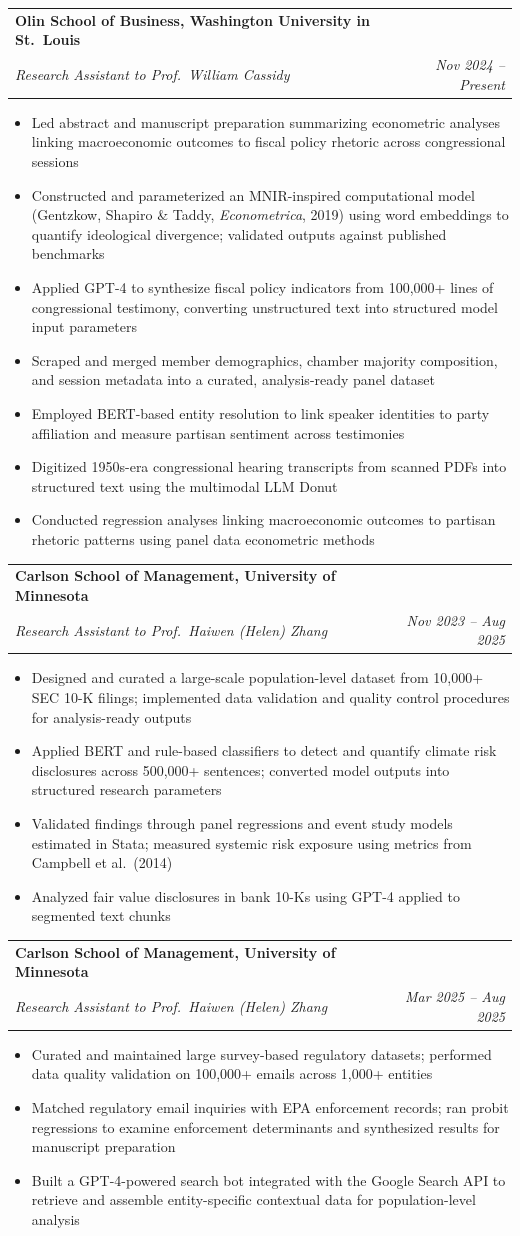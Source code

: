 \documentclass[letterpaper,11pt]{article}
\makeatletter
\newcommand{\resumeItem}[1]{
  \item\small{#1 \vspace{-2pt}}
}
\newcommand{\resumeSubheading}[4]{
  \vspace{-2pt}\item
    \begin{tabular*}{0.97\textwidth}[t]{l@{\extracolsep{\fill}}r}
      \textbf{#1} & \small #2 \\
      \textit{\small#3} & \textit{\small #4} \\
    \end{tabular*}\vspace{-7pt}
}
\newcommand{\resumeItemListStart}{\begin{itemize}}
\newcommand{\resumeItemListEnd}{\end{itemize}\vspace{-5pt}}
\makeatother
\begin{document}
  \resumeSubheading
    {Olin School of Business, Washington University in St.\ Louis}{}
    {Research Assistant to Prof.\ William Cassidy \normalfont{(Empirical Macro-Finance)}}{Nov 2024 -- Present}
    \resumeItemListStart
      \resumeItem{Led abstract and manuscript preparation summarizing econometric analyses linking macroeconomic outcomes to fiscal policy rhetoric across congressional sessions}
      \resumeItem{Constructed and parameterized an MNIR-inspired computational model (Gentzkow, Shapiro \& Taddy, \textit{Econometrica}, 2019) using word embeddings to quantify ideological divergence; validated outputs against published benchmarks}
      \resumeItem{Applied GPT-4 to synthesize fiscal policy indicators from 100,000+ lines of congressional testimony, converting unstructured text into structured model input parameters}
      \resumeItem{Scraped and merged member demographics, chamber majority composition, and session metadata into a curated, analysis-ready panel dataset}
      \resumeItem{Employed BERT-based entity resolution to link speaker identities to party affiliation and measure partisan sentiment across testimonies}
      \resumeItem{Digitized 1950s-era congressional hearing transcripts from scanned PDFs into structured text using the multimodal LLM Donut}
      \resumeItem{Conducted regression analyses linking macroeconomic outcomes to partisan rhetoric patterns using panel data econometric methods}
    \resumeItemListEnd

  \resumeSubheading
    {Carlson School of Management, University of Minnesota}{}
    {Research Assistant to Prof.\ Haiwen (Helen) Zhang \normalfont{(Climate Risk Disclosure)}}{Nov 2023 -- Aug 2025}
    \resumeItemListStart
      \resumeItem{Designed and curated a large-scale population-level dataset from 10,000+ SEC 10-K filings; implemented data validation and quality control procedures for analysis-ready outputs}
      \resumeItem{Applied BERT and rule-based classifiers to detect and quantify climate risk disclosures across 500,000+ sentences; converted model outputs into structured research parameters}
      \resumeItem{Validated findings through panel regressions and event study models estimated in Stata; measured systemic risk exposure using metrics from Campbell et al.\ (2014)}
      \resumeItem{Analyzed fair value disclosures in bank 10-Ks using GPT-4 applied to segmented text chunks}
    \resumeItemListEnd

  \resumeSubheading
    {Carlson School of Management, University of Minnesota}{}
    {Research Assistant to Prof.\ Haiwen (Helen) Zhang \normalfont{(Environmental Enforcement)}}{Mar 2025 -- Aug 2025}
    \resumeItemListStart
      \resumeItem{Curated and maintained large survey-based regulatory datasets; performed data quality validation on 100,000+ emails across 1,000+ entities}
      \resumeItem{Matched regulatory email inquiries with EPA enforcement records; ran probit regressions to examine enforcement determinants and synthesized results for manuscript preparation}
      \resumeItem{Built a GPT-4-powered search bot integrated with the Google Search API to retrieve and assemble entity-specific contextual data for population-level analysis}
    \resumeItemListEnd
\end{document}
